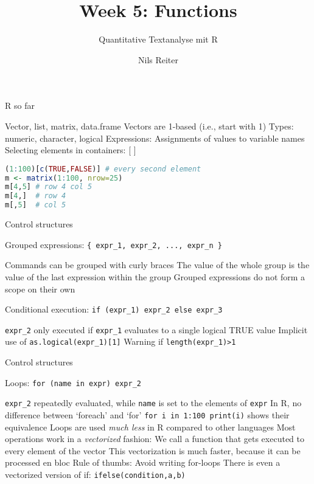 \documentclass[aspectratio=169]{beamer}
\title{Week 5: Functions}
\subtitle{Quantitative Textanalyse mit R}
\author{Nils Reiter}
\begin{document}

\frame{\maketitle}

\begin{frame}[fragile]{R so far}
\begin{outline}
\1 Vector, list, matrix, data.frame
\2 Vectors are 1-based (i.e., start with 1)
\1 Types: numeric, character, logical
\1 Expressions: Assignments of values to variable names
\1 Selecting elements in containers: [ ]
\end{outline}
\pause
\begin{lstlisting}[language=r]
(1:100)[c(TRUE,FALSE)] # every second element
m <- matrix(1:100, nrow=25)
m[4,5] # row 4 col 5
m[4,]  # row 4
m[,5]  # col 5
\end{lstlisting}
\end{frame}


\begin{frame}[fragile]{Control structures}
\begin{block}{Grouped expressions: \lstinline!{ expr_1, expr_2, ..., expr_n }!}
\begin{outline}
\1 Commands can be grouped with curly braces
\1 The value of the whole group is the value of the last expression within the group
\1 Grouped expressions do not form a scope on their own
\end{outline}
\end{block}
\pause
\begin{block}{Conditional execution: \lstinline!if (expr_1) expr_2 else expr_3!}
\begin{outline}
\1 \lstinline{expr_2} only executed if \lstinline{expr_1} evaluates to a single logical TRUE value
\1 Implicit use of \lstinline{as.logical(expr_1)[1]}
\1 Warning if \lstinline{length(expr_1)>1}
\end{outline}
\end{block}
\end{frame}

\begin{frame}[fragile]{Control structures}
\begin{block}{Loops: \lstinline!for (name in expr) expr_2 !}
\begin{outline}
\1 \lstinline!expr_2! repeatedly evaluated, while \lstinline!name! is set to the elements of \lstinline!expr!
\1 In R, no difference between `foreach' and `for'
\1 \lstinline!for i in 1:100 print(i)! shows their equivalence
\pause
\1 Loops are used \emph{much less} in R compared to other languages
\2 Most operations work in a \emph{vectorized} fashion: We call a function that gets executed to every element of the vector
\2 This vectorization is much faster, because it can be processed en bloc
\2 Rule of thumbs: Avoid writing for-loops
\2 There is even a vectorized version of if: \lstinline{ifelse(condition,a,b)}
\end{outline}
\end{block}
\end{frame}
\end{document}
